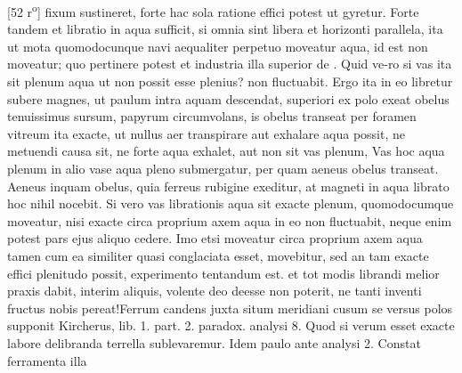 [52 r\textsuperscript{o}] fixum  sustineret, forte hac sola ratione effici potest ut gyretur. Forte tandem et libratio in aqua sufficit, si omnia sint libera et horizonti parallela, ita ut mota quomodocunque navi\protect{} aequaliter perpetuo moveatur aqua, id est non moveatur; quo\hspace{1pt} pertinere\hspace{1pt} potest\hspace{1pt} et\hspace{1pt} industria\hspace{1pt} illa\hspace{1pt} superior\hspace{1pt} de\hspace{1pt} .\hspace{1pt} Quid ve-\pend\pstart\noindent ro si vas ita sit plenum aqua ut non possit esse plenius?  non fluctuabit. Ergo ita in eo libretur subere magnes\protect{}, ut paulum intra aquam descendat, superiori ex polo\protect{} exeat obelus tenuissimus sursum, papyrum circumvolans, is obelus transeat per foramen vitreum ita exacte, ut nullus aer transpirare aut exhalare aqua possit,  ne metuendi causa sit, ne forte aqua exhalet, aut non sit vas plenum, Vas hoc aqua plenum in alio vase aqua pleno submergatur, per quam aeneus obelus transeat. Aeneus inquam obelus, quia ferreus rubigine exeditur, at magneti in aqua librato hoc nihil nocebit. Si vero vas librationis aqua sit exacte plenum, quomodocumque moveatur, nisi exacte circa proprium axem aqua in eo non fluctuabit, neque enim potest pars ejus aliquo cedere. Imo etsi moveatur circa proprium axem aqua tamen cum ea similiter quasi conglaciata esset, movebitur, sed an tam exacte effici plenitudo possit, experimento tentandum est.  et tot modis librandi melior praxis dabit, interim aliquis, volente deo deesse non poterit, ne tanti inventi fructus nobis pereat!\pend \pstart Ferrum candens juxta situm meridiani\protect{} cusum se versus polos\protect{} supponit Kircherus, lib. 1. part. 2. paradox. analysi 8. Quod si verum esset exacte labore delibranda terrella sublevaremur. Idem paulo ante analysi 2. Constat ferramenta illa 